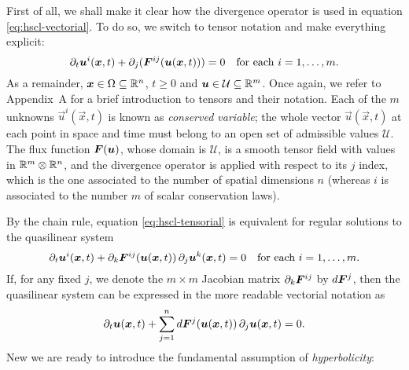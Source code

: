 First of all, we shall make it clear how the divergence operator
is used in equation \eqref{eq:hscl-vectorial}.
To do so, we switch to tensor notation and make everything explicit:
\begin{equation} \label{eq:hscl-tensorial}
\partial_t \bm{u}^i(\bm{x},t) + \partial_j (\bm{F}^{ij}(\bm{u}(\bm{x},t))) = 0
\quad \text{for each $i = 1, \dots, m$.}
\end{equation}
As a remainder, $\bm{x} \in \Omega \subseteq \mathbb{R}^n$, $t \geq 0$ and
$\bm{u} \in \mathcal{U} \subseteq \mathbb{R}^m$.
Once again, we refer to Appendix~A for a brief introduction
to tensors and their notation.
Each of the $m$ unknowns $\vec{u}^i(\vec{x},t)$ is known as
\emph{conserved variable}; %
the whole vector $\vec{u}(\vec{x},t)$ at each point in space and time must belong
to an open set of admissible values $\mathcal{U}$.
The flux function $\bm{F}(\bm{u})$, whose domain is $\mathcal{U}$,
is a smooth tensor field with values in $\mathbb{R}^m \otimes \mathbb{R}^n$,
and the divergence operator is applied with respect
to its $j$ index, which is the one associated to the number
of spatial dimensions $n$ (whereas $i$ is associated to the number $m$ of
scalar conservation laws).

By the chain rule, equation \eqref{eq:hscl-tensorial} is equivalent
for regular solutions to the quasilinear system
\begin{equation} \label{eq:hscl-quasilinear-tensorial}
\partial_t \bm{u}^i(\bm{x},t)
+  \partial_k \bm{F}^{ij} (\bm{u}(\bm{x},t))
\, \partial_j \bm{u}^k (\bm{x},t) = 0
\quad \text{for each $i = 1, \dots, m$.}
\end{equation}
If, for any fixed $j$, we denote the $m \times m$ Jacobian matrix
$\partial_k \bm{F}^{ij}$ by $d\bm{F}^j$, then the quasilinear system
can be expressed in the more readable vectorial notation as
\begin{equation} \label{eq:hscl-quasilinear-vectorial}
\partial_t \bm{u}(\bm{x},t)
+ \sum_{j=1}^n d\bm{F}^j(\bm{u}(\bm{x},t))
\, \partial_j \bm{u}(\bm{x},t) = 0.
\end{equation}
New we are ready to introduce the fundamental %
assumption of \emph{hyperbolicity}:

